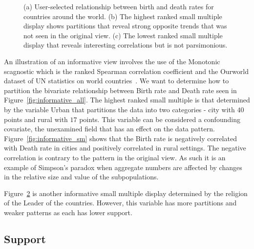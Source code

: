 \begin{figure}
\begin{subfigure}{3in}
		  \caption{}
		 \label{fig:informative_sm_big}
	 \end{subfigure}
	  \caption{(a) User-selected relationship between birth and death rates for countries around the world. (b) The highest ranked small multiple display shows partitions that reveal strong opposite trends that was not seen in the original view. (c) The lowest ranked small multiple display that reveals interesting correlations but is not parsimonious.}
\end{figure}
An illustration of an informative view involves the use of the Monotonic scagnostic  which is the ranked Spearman correlation coefficient and the Ourworld dataset of UN statistics on world countries~\cite{Wilkinson2005GG,Wilkinson2008}. We want to determine how to partition the bivariate relationship between Birth rate and Death rate seen in Figure~\ref{fig:informative_all}. The highest ranked small multiple is that determined by the variable Urban that partitions the data into two categories - city with $40$ points and rural with $17$ points. This variable can be considered a confounding covariate, the unexamined field that has an effect on the data pattern. Figure~\ref{fig:informative_sm} shows that the Birth rate is negatively correlated with Death rate in cities and positively correlated in rural settings. The negative correlation is contrary to the pattern in the original view. As such it is an example of Simpson's paradox when aggregate numbers are affected by changes in the relative size and value of the subpopulations. 
 
Figure~\ref{fig:informative_sm_big} is another informative small multiple display determined by the religion of the Leader of the countries. However, this variable has more partitions and weaker patterns as each has lower support. 

\subsection{Support}

